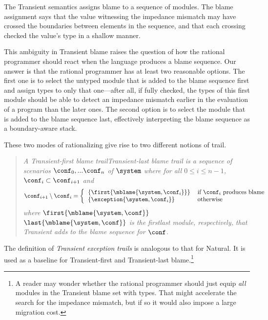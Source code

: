 
The Transient semantics assigns blame to a sequence of modules. The blame
assignment says that the value witnessing the impedance mismatch may have
crossed the boundaries between elements in the sequence, and that each crossing
checked the value's type in a shallow manner.

This ambiguity in Transient blame raises the question of how the rational
programmer should react when the language produces a blame sequence. Our answer
is that the rational programmer has at least two reasonable options. The first
one is to select the untyped module that is added to the blame sequence first and
assign types to only that one---after all, if fully checked, the types of this
first module should be able to detect an impedance mismatch earlier in the
evaluation of a program than the later ones. The second option is to select the
module that is added to the blame sequence last, effectively interpreting the
blame sequence as a boundary-aware stack.

These two modes of rationalizing give rise to two different notions of trail.

\begin{quote}
\it A \emph{Transient-first blame trail}{\lrdef}\emph{Transient-last blame trail} is a sequence of scenarios
$\conf_0,...\conf_n$ of $\system$ where for all $0 \leq i \leq n - 1$,
$\conf_i \subset \conf_{i+1}$ and
\[ \conf_{i+1} \setminus \conf_i = %
\left\{ %
\begin{tabular}{ll} %
$\{\first{\mblame{\system, \conf_i}}\}$  & if $\conf_i$ produces blame \\ %
$\{\exception{\system, \conf_i}\}$     & otherwise \\ %
\end{tabular} \right. %
\]
where $\first{\mblame{\system, \conf}}${\lrdef}$\last{\mblame{\system, \conf}}$ is the
first{\lrdef}last module, respectively,  that Transient adds to the blame sequence for $\conf$.
\end{quote}

The definition of \emph{Transient exception trails} is analogous to that for
Natural. It is used as a baseline for Transient-first and Transient-last
blame.\footnote{A reader may wonder whether the rational programmer
should just equip {\em all\/} modules in the Transient blame set
with types. That might accelerate the search for the impedance
mismatch, but if so it would also impose a large migration cost.}
